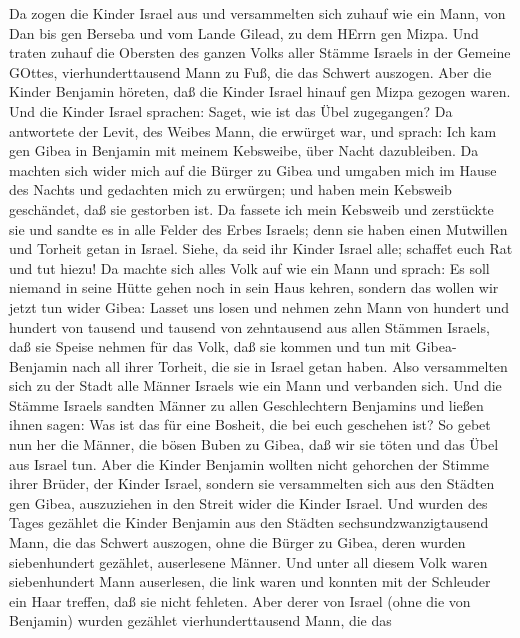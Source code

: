  Da zogen die Kinder Israel aus und versammelten sich zuhauf
wie ein Mann, von Dan bis gen Berseba und vom Lande Gilead, zu dem HErrn
gen Mizpa.  Und traten zuhauf die Obersten des ganzen Volks
aller Stämme Israels in der Gemeine GOttes, vierhunderttausend Mann zu
Fuß, die das Schwert auszogen.  Aber die Kinder Benjamin
höreten, daß die Kinder Israel hinauf gen Mizpa gezogen waren. Und die
Kinder Israel sprachen: Saget, wie ist das Übel zugegangen? 
Da antwortete der Levit, des Weibes Mann, die erwürget war, und sprach:
Ich kam gen Gibea in Benjamin mit meinem Kebsweibe, über Nacht
dazubleiben.  Da machten sich wider mich auf die Bürger zu
Gibea und umgaben mich im Hause des Nachts und gedachten mich zu
erwürgen; und haben mein Kebsweib geschändet, daß sie gestorben ist.
 Da fassete ich mein Kebsweib und zerstückte sie und sandte
es in alle Felder des Erbes Israels; denn sie haben einen Mutwillen und
Torheit getan in Israel.  Siehe, da seid ihr Kinder Israel
alle; schaffet euch Rat und tut hiezu!  Da machte sich alles
Volk auf wie ein Mann und sprach: Es soll niemand in seine Hütte gehen
noch in sein Haus kehren,  sondern das wollen wir jetzt tun
wider Gibea:  Lasset uns losen und nehmen zehn Mann von
hundert und hundert von tausend und tausend von zehntausend aus allen
Stämmen Israels, daß sie Speise nehmen für das Volk, daß sie kommen und
tun mit Gibea-Benjamin nach all ihrer Torheit, die sie in Israel getan
haben.  Also versammelten sich zu der Stadt alle Männer
Israels wie ein Mann und verbanden sich.  Und die Stämme
Israels sandten Männer zu allen Geschlechtern Benjamins und ließen ihnen
sagen: Was ist das für eine Bosheit, die bei euch geschehen ist?
 So gebet nun her die Männer, die bösen Buben zu Gibea, daß
wir sie töten und das Übel aus Israel tun. Aber die Kinder Benjamin
wollten nicht gehorchen der Stimme ihrer Brüder, der Kinder Israel,
 sondern sie versammelten sich aus den Städten gen Gibea,
auszuziehen in den Streit wider die Kinder Israel.  Und
wurden des Tages gezählet die Kinder Benjamin aus den Städten
sechsundzwanzigtausend Mann, die das Schwert auszogen, ohne die Bürger
zu Gibea, deren wurden siebenhundert gezählet, auserlesene Männer.
 Und unter all diesem Volk waren siebenhundert Mann
auserlesen, die link waren und konnten mit der Schleuder ein Haar
treffen, daß sie nicht fehleten.  Aber derer von Israel
(ohne die von Benjamin) wurden gezählet vierhunderttausend Mann, die das

